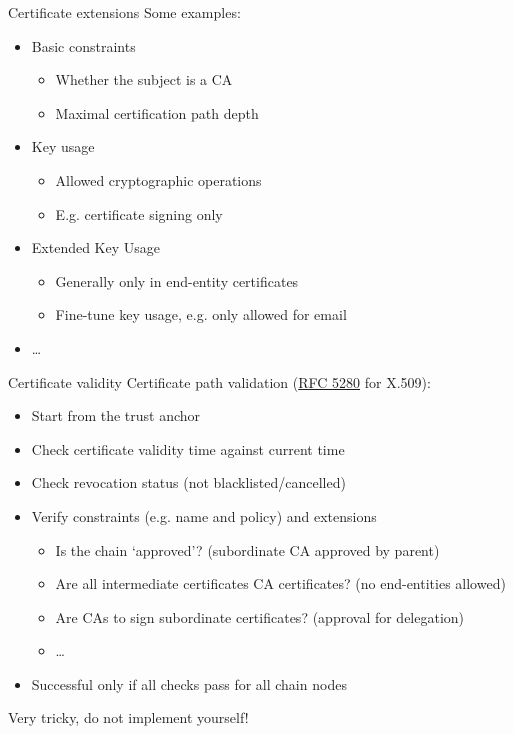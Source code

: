 \begin{frame}{Certificate extensions}
  Some examples:
  \begin{itemize}[<+(1)->]
    \item Basic constraints
    \begin{itemize}
      \item Whether the subject is a CA
      \item Maximal certification path depth
    \end{itemize}
    \item Key usage
    \begin{itemize}
      \item Allowed cryptographic operations
      \item E.g. certificate signing only
    \end{itemize}
    \item Extended Key Usage
    \begin{itemize}
      \item Generally only in end-entity certificates
      \item Fine-tune key usage, e.g. only allowed for email
    \end{itemize}
    \item \dots
  \end{itemize}
\end{frame}

\begin{frame}{Certificate validity}
  \pause
  Certificate path validation (\href{https://datatracker.ietf.org/doc/html/rfc5280}{RFC 5280} for X.509):
  \begin{itemize}[<+(1)->]
    \item Start from the trust anchor
    \item Check certificate validity time against current time
    \item Check revocation status (not blacklisted/cancelled)
    \item Verify constraints (e.g. name and policy) and extensions
    \begin{itemize}
      \item Is the chain `approved'? (subordinate CA approved by parent)
      \item Are all intermediate certificates CA certificates? (no end-entities allowed)
      \item Are CAs to sign subordinate certificates? (approval for delegation)
      \item \dots
    \end{itemize}
    \item Successful only if all checks pass for all chain nodes
  \end{itemize}

  \pause
  Very tricky, do not implement yourself!
\end{frame}

